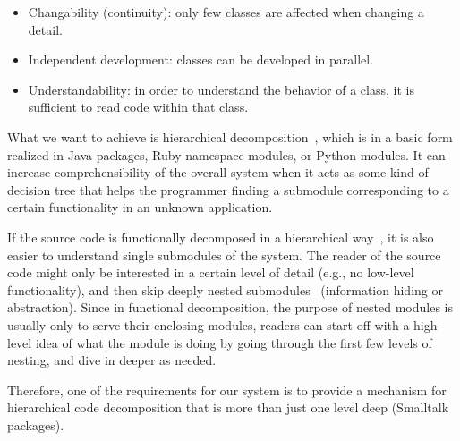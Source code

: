 \begin{itemize}
	\item Changability (continuity): only few classes are affected when changing a detail.
	\item Independent development: classes can be developed in parallel.
	\item Understandability: in order to understand the behavior of a class, it is sufficient to read code within that class.
\end{itemize}

What we want to achieve is hierarchical decomposition~\cite{Blume:1999:HM:325478.325518}, which is in a basic form realized in Java packages, Ruby namespace modules, or Python modules. It can increase comprehensibility of the overall system when it acts as some kind of decision tree that helps the programmer finding a submodule corresponding to a certain functionality in an unknown application. 


If the source code is functionally decomposed in a hierarchical way~\cite{Tsui:2009:ESE:1823101}, it is also easier to understand single submodules of the system. The reader of the source code might only be interested in a certain level of detail (e.g., no low-level functionality), and then skip deeply nested submodules~\cite{hierarch1} (information hiding or abstraction). Since in functional decomposition, the purpose of nested modules is usually only to serve their enclosing modules, readers can start off with a high-level idea of what the module is doing by going through the first few levels of nesting, and dive in deeper as needed.

Therefore, one of the requirements for our system is to provide a mechanism for hierarchical code decomposition that is more than just one level deep (Smalltalk packages).

